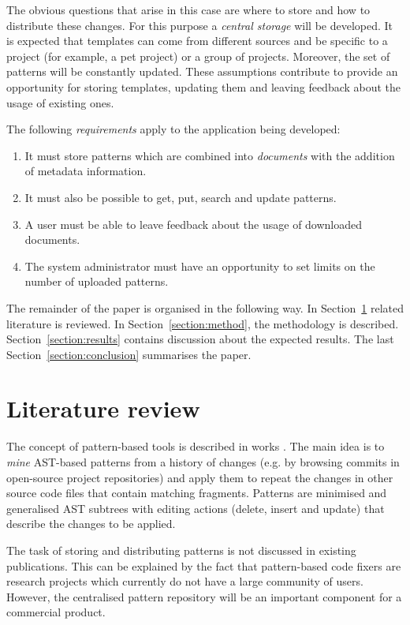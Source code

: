 \documentclass[letterpaper, 10 pt, conference]{ieeeconf}  %
\begin{document}
The obvious questions that arise in this case are where to store and
how to distribute these changes. 
For this purpose a \emph{central storage} will be developed. 
It is expected that templates can come from different sources and be specific
to a project (for example, a pet project) or a group of projects. 
Moreover, the set of patterns will be constantly updated. 
These assumptions contribute to provide an opportunity for storing templates,
updating them and leaving feedback about the usage of existing ones.

The following \emph{requirements} apply to the application being developed:
\begin{enumerate}
    \item It must store patterns which are combined into \emph{documents}
    with the addition of metadata information.
    \item It must also be possible to get, put, search and
    update patterns.
    \item A user must be able to leave feedback about the usage of
    downloaded documents.
    \item The system administrator must have an opportunity to set limits on
    the number of uploaded patterns.
\end{enumerate}

The remainder of the paper is organised in the following way. 
In Section~\ref{section:review} related literature is reviewed. 
In Section~\ref{section:method}, the methodology is described. 
Section~\ref{section:results} contains discussion about the expected results.
The last Section~\ref{section:conclusion} summarises the paper.

\section{Literature review}
\label{section:review}

The concept of pattern-based tools is described in works \cite{c1, c2, c3}.
The main idea is to \emph{mine} AST-based patterns from a history of 
changes (e.g. by browsing commits in open-source project repositories) and 
apply them to repeat the changes in other source code files that contain
matching fragments. 
Patterns are minimised and generalised AST subtrees with editing actions
(delete, insert and update) \cite{c9} that describe the changes to be applied.

The task of storing and distributing patterns is not discussed in existing
publications. 
This can be explained by the fact that pattern-based code fixers are research
projects which currently do not have a large community of users. 
However, the centralised pattern repository will be an important component
for a commercial product.
\end{document}
